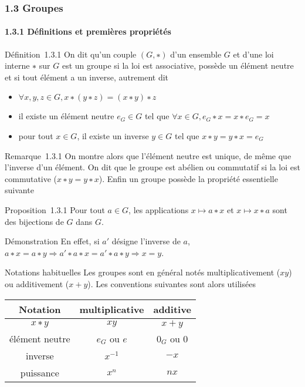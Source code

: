 \subsubsection{1.3 Groupes}

\paragraph{1.3.1 Définitions et premières propriétés}

Définition~1.3.1 On dit qu'un couple $(G,∗)$ d'un ensemble $G$ et d'une loi
interne $∗$ sur $G$ est un groupe si la loi est associative, possède un
élément neutre et si tout élément a un inverse, autrement dit

\begin{itemize}
\itemsep1pt\parskip0pt
\item
  $\forall x,y,z \in G, x ∗ (y ∗ z) = (x ∗ y) ∗ z$
\item
  il existe un élément neutre $e_G \in G$ tel que
  $\forall x \in G, e_G ∗ x = x ∗ e_G = x$
\item
  pour tout $x \in G$, il existe un inverse $y \in G$ tel que $x ∗ y = y ∗ x = e_G$
\end{itemize}

Remarque~1.3.1 On montre alors que l'élément neutre est unique, de même
que l'inverse d'un élément. On dit que le groupe est abélien ou
commutatif si la loi est commutative ($x ∗ y = y ∗ x$). Enfin un groupe
possède la propriété essentielle suivante

Proposition~1.3.1 Pour tout $a \in G$, les applications
$x \mapsto a ∗ x$ et $x \mapsto x ∗ a$
sont des bijections de $G$ dans $G$.

Démonstration En effet, si $a'$ désigne l'inverse de $a$, $a ∗ x = a ∗ y \Rightarrow a' ∗ a ∗ x = a' ∗ a ∗ y \Rightarrow x = y$.

Notations habituelles Les groupes sont en général notés
multiplicativement ($xy$) ou additivement ($x + y$). Les conventions
suivantes sont alors utilisées

\begin{center}
\begin{tabular}{|c|c|c|}
\hline
Notation & multiplicative & additive \\
\hline
$x ∗ y$ & $xy$ & $x + y$ \\
élément neutre & $e_G$ ou $e$ & $0_G$ ou $0$ \\
inverse & $x^{-1}$ & $-x$ \\
puissance & $x^n$ & $nx$ \\
\hline
\end{tabular}
\end{center}

